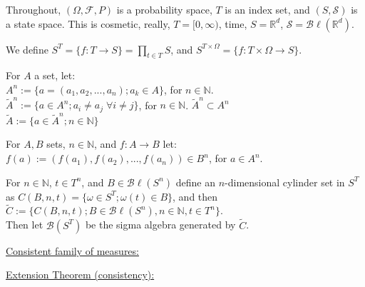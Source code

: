 \documentclass[12pt]{article}
\newcommand{\nats}[0] { \mathbb{N}}
\newcommand{\reals}[0] { \mathbb{R}}
\newcommand{\B}[0] { \mathcal{B} }
\newcommand{\F}[0] { \mathcal{F} }
\newcommand{\om}[0] { \omega }
\newcommand{\Om}[0] { \Omega }
\newcommand{\Bl}[0] { \mathcal{B} \ell }
\newcommand{\rarw}[0] { \rightarrow }
\begin{document}
\begin{flushleft}
Throughout, $(\Om, \F, P )$ is a probability space, $T$ is an index set, and $(S, \mathcal{S} )$ is a state space. This is cosmetic, really, $T = [0, \infty )$, time, $S = \reals^d$, $\mathcal{S} = \Bl(\reals^d)$. 
\end{flushleft}

\begin{flushleft}
We define $S^T = \{ f: T \rightarrow S \} = \prod_{t \in T} S$, and  $S^{T \times \Om} = \{ f: T \times \Om \rightarrow S \}$. 
\end{flushleft}

\begin{flushleft}
For $A$ a set, let:\\
$A^n := \{ a = (a_1, a_2, ..., a_n ) ; a_k \in A  \}$, for $n \in \nats$.\\
$\tilde{A}^n := \{ a \in A^n ; a_i \not = a_j \; \forall i \not = j  \}$, for $n \in \nats$. $\tilde{A}^n \subset A^n$ \\
$\tilde{A} := \{ a \in \tilde{A}^n; n \in \nats \}$
\end{flushleft}

\begin{flushleft}
For $A,B$ sets, $n \in \nats$, and $f: A \rarw B$ let:\\
$f(a) := ( f(a_1), f(a_2), ..., f(a_n) ) \in B^n$, for $a \in A^n$.  \\
\end{flushleft}

\begin{flushleft}
For $n \in \nats$, $t \in T^n$, and $B \in \Bl(S^n)$ define an $n$-dimensional cylinder set in $S^T$ as
$ C( B, n, t ) = \{ \om \in S^T; \om (t) \in B \} $, and then $\tilde{C} := \{ C( B, n, t ); B \in \Bl(S^n), n \in \nats, t \in T^n \}$. \\
Then let $\B(S^T)$ be the sigma algebra generated by $\tilde{C}$.
\end{flushleft}

\begin{flushleft}
\underline{Consistent family of measures:}
\end{flushleft}






\begin{flushleft}
\underline{Extension Theorem (consistency):}
\end{flushleft}
\end{document}
